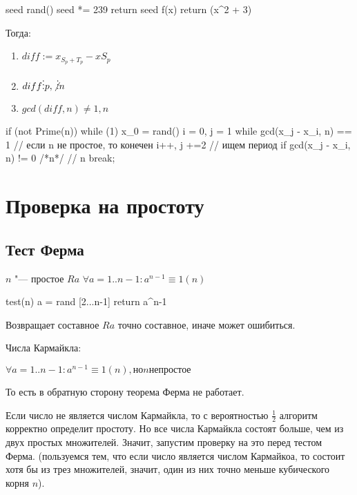 \begin{cppcode}
seed
rand()
	seed *= 239
	return seed
f(x)
	return (x^2 + 3) %
\end{cppcode}

Тогда:
\begin{enumerate}
	\item $diff := x_{S_p + T_p} - x{S_p}$
	\item $diff \vdots p, \not\vdots n$
	\item $gcd(diff, n) \neq 1, n$
\end{enumerate}

\begin{cppcode}
if (not Prime(n))
while (1)
	x_0 = rand()
	i = 0, j = 1
	while gcd(x_j - x_i, n) == 1	// если n не простое, то конечен
		i++, j +=2			// ищем период
	if gcd(x_j - x_i, n) != 0 /*n*/ 	// \log n
		break;
\end{cppcode}

\section{Проверка на простоту}

\subsection{Тест Ферма}

\begin{lemma}
$n$ "--- простое $Ra$ $ \forall a = 1 .. n-1: a^{n-1} \equiv 1 (n) $
\end{lemma}

\begin{cppcode}
test(n)
	a = rand [2...n-1]
	return a^{n-1} %
\end{cppcode}

Возвращает составное $Ra$ точно составное, иначе может ошибиться.

Числа Кармайкла:

$\forall a = 1 .. n-1: a^{n-1} \equiv 1 (n), но n не простое$

То есть в обратную сторону теорема Ферма не работает.

Если число не является числом Кармайкла, то с вероятностью $ \frac{1}{2} $ алгоритм корректно определит простоту. Но все числа Кармайкла состоят больше, чем из двух простых множителей. Значит, запустим проверку на это перед тестом Ферма. (пользуемся тем, что если число является числом Кармайкоа, то состоит хотя бы из трез множителей, значит, один из них точно меньше кубического корня $n$).

